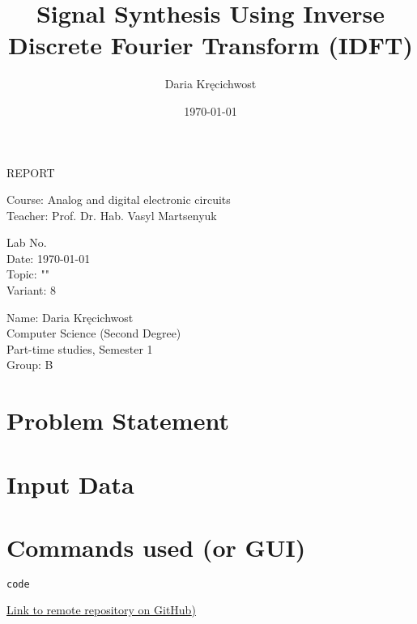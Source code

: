 \documentclass[12pt]{article}
\title{Signal Synthesis Using Inverse Discrete Fourier Transform (IDFT)}
\author{Daria Kręcichwost}
\date{\today}
\begin{document}
\begin{titlepage}
    \centering
    \vspace*{2cm}
    
    \Huge
    REPORT
    
    \vspace{1cm}
    
    \Large
    Course: Analog and digital electronic circuits \\
    Teacher: Prof. Dr. Hab. Vasyl Martsenyuk
    
    \vfill
    
    \Large
    Lab No. \\
    Date: \today \\
    Topic: "" \\
    Variant: 8
    
    \vspace{1cm}
    
    \large
    Name: Daria Kręcichwost \\
    Computer Science (Second Degree) \\
    Part-time studies, Semester 1 \\
    Group: B
\end{titlepage}

\newpage

\maketitle


\section{Problem Statement}


\section{Input Data}


\section{Commands used (or GUI)}


\begin{lstlisting}[language=Python, breaklines=true]
code

\end{lstlisting}
\item \href{https://github.com/DariaKrecichwostQA/StudiaUBB/tree/main/Digital%20Signal%20Processing/Zad1}{{Link to remote repository on GitHub})}
\end{document}
